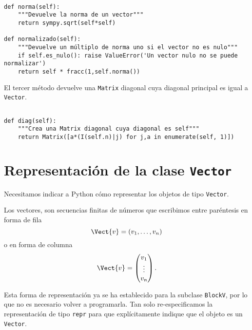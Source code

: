 \documentclass[11pt]{report}
\begin{document}
\begin{verbatim}

def norma(self):
    """Devuelve la norma de un vector"""
    return sympy.sqrt(self*self)
                                                               
def normalizado(self):
    """Devuelve un múltiplo de norma uno si el vector no es nulo"""
    if self.es_nulo(): raise ValueError('Un vector nulo no se puede normalizar')
    return self * fracc(1,self.norma())

\end{verbatim}

El tercer método devuelve una \texttt{Matrix} diagonal cuya diagonal
principal es igual a \texttt{Vector}.

\begin{verbatim}

def diag(self):
    """Crea una Matrix diagonal cuya diagonal es self"""
    return Matrix([a*(I(self.n)|j) for j,a in enumerate(self, 1)])

\end{verbatim}

\section{Representación de la clase \texttt{Vector}}
\label{sec:orge976fae}

Necesitamos indicar a Python cómo representar los objetos de tipo
\texttt{Vector}.

Los vectores, son secuencias finitas de números que escribimos entre
paréntesis en forma de fila
\begin{displaymath}
  \Vect{v}=(v_1,\ldots,v_n)
\end{displaymath}
o en forma de columna
\begin{displaymath}
  \Vect{v}=\begin{pmatrix}v_1\\ \vdots \\ v_n\end{pmatrix}.
\end{displaymath}

Esta forma de representación ya se ha establecido para la subclase
\texttt{BlockV}, por lo que no es necesario volver a programarla. Tan solo
re-especificamos la representación de tipo \texttt{repr} para que
explícitamente indique que el objeto es un \texttt{Vector}.
\end{document}
